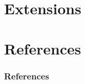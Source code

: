\documentclass{beamer}
\begin{document}
\section{Extensions}


\section*{References}
\begin{frame}[allowframebreaks]
  \frametitle{References}
  
  
\end{frame}
\end{document}
